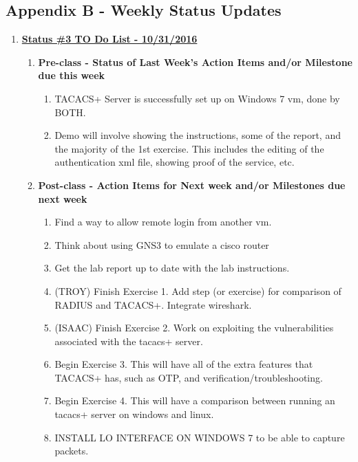 \documentclass[main.tex]{subfiles}
\begin{document}
\subsection{Appendix B - Weekly Status Updates}
\label{sec:B}
\begin{enumerate}[leftmargin=12mm,labelsep=0.1cm]
    \item[] \textbf{\Large \underline{Status \#3 TO Do List - 10/31/2016}}
    \begin{enumerate}
        \item \textbf{Pre-class - Status of Last Week's Action Items and/or Milestone due this week}
        \begin{enumerate}
            \item TACACS+ Server is successfully set up on Windows 7 vm, done by BOTH. 
            \item Demo will involve showing the instructions, some of the report, and the majority of the 1st exercise. This includes the editing of the authentication xml file, showing proof of the service, etc.
        \end{enumerate}
        \item \textbf{Post-class - Action Items for Next week and/or Milestones due next week}
        \begin{enumerate}
            \item Find a way to allow remote login from another vm.
            \item Think about using GNS3 to emulate a cisco router
            \item Get the lab report up to date with the lab instructions.
            \item (TROY) Finish Exercise 1. Add step (or exercise) for comparison of RADIUS and TACACS+. Integrate wireshark. 
            \item (ISAAC) Finish Exercise 2. Work on exploiting the vulnerabilities associated with the tacacs+ server.
            \item Begin Exercise 3. This will have all of the extra features that TACACS+ has, such as OTP, and verification/troubleshooting.
            \item Begin Exercise 4. This will have a comparison between running an tacacs+ server on windows and linux.
            \item INSTALL LO INTERFACE ON WINDOWS 7 to be able to capture packets.
        \end{enumerate}
    \end{enumerate}
\end{enumerate}
\end{document}
